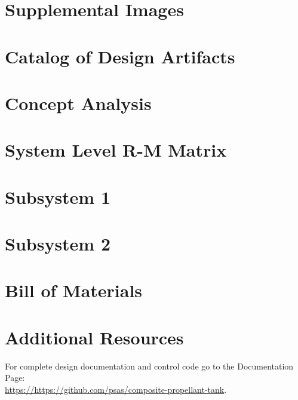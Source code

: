 \begin{appendices}

\section {Supplemental Images}
\label{appendix:SupImages}

\section {Catalog of Design Artifacts}
\label{appendix:DesignArt}


\section {Concept Analysis}
\label{appendix:Concept}


\section {System Level R-M Matrix}
\label{appendix:RMMatrix}


\section {Subsystem 1}
\label{appendix:Sub1}


\section {Subsystem 2}
\label{appendix:Sub2}


\section {Bill of Materials}
\label{appendix:BOM}

\section {Additional Resources}
\label{appendix:DesignRep}
For complete design documentation and control code go to the Documentation Page:\\ \href{https://github.com/PSAS/...}{https://https://github.com/psas/composite-propellant-tank}.\\

\end{appendices}

